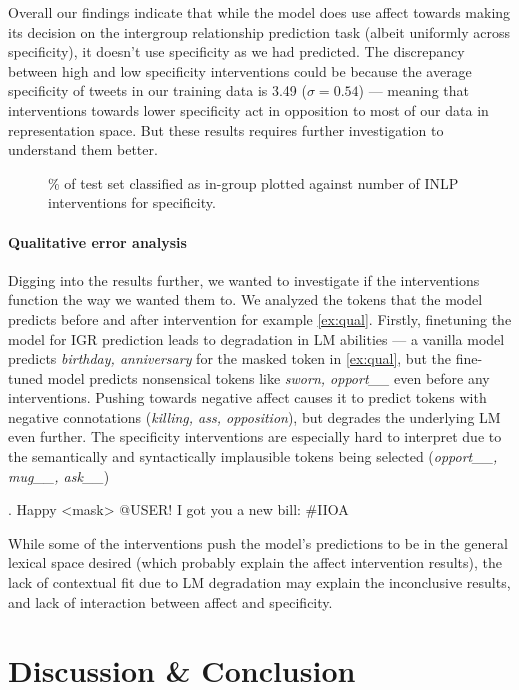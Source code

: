 Overall our findings indicate that while the model does use affect towards making its decision on the intergroup relationship prediction task (albeit uniformly across specificity), it doesn't use specificity as we had predicted. The discrepancy between high and low specificity interventions could be because the average specificity of tweets in our training data is 3.49 ($\sigma=0.54$) --- meaning that interventions towards lower specificity act in opposition to most of our data in representation space. But these results requires further investigation to understand them better.

\begin{figure}[t]
    \centering
    
    \caption{\% of test set classified as in-group plotted against number of INLP interventions for specificity.}
    \label{fig:spec}
\end{figure}

\paragraph{Qualitative error analysis} Digging into the results further, we wanted to investigate if the interventions function the way we wanted them to. We analyzed the tokens that the model predicts before and after intervention for example \ref{ex:qual}. Firstly, finetuning the model for IGR prediction leads to degradation in LM abilities --- a vanilla model predicts \emph{birthday, anniversary} for the masked token in \ref{ex:qual}, but the fine-tuned model predicts nonsensical tokens like \emph{sworn, opport\_\_} even before any interventions. Pushing towards negative affect causes it to predict tokens with negative connotations (\emph{killing, ass, opposition}), but degrades the underlying LM even further. The specificity interventions are especially hard to interpret due to the semantically and syntactically implausible tokens being selected (\emph{opport\_\_, mug\_\_, ask\_\_}) 

\ex.\label{ex:qual} Happy <mask> @USER! I got you a new bill: \#IIOA

While some of the interventions push the model's predictions to be in the general lexical space desired (which probably explain the affect intervention results), the lack of contextual fit due to LM degradation may explain the inconclusive results, and lack of interaction between affect and specificity.

\section{Discussion \& Conclusion}

